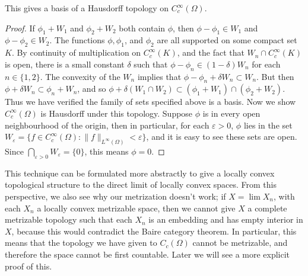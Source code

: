 \begin{theorem}
    This gives a basis of a Hausdorff topology on $C_c^\infty(\Omega)$.
\end{theorem}
\begin{proof}
    If $\phi_1 + W_1$ and $\phi_2 + W_2$ both contain $\phi$, then $\phi - \phi_1 \in W_1$ and $\phi - \phi_2 \in W_2$. The functions $\phi, \phi_1$, and $\phi_2$ are all supported on some compact set $K$. By continuity of multiplication on $C_c^\infty(K)$, and the fact that $W_n \cap C_c^\infty(K)$ is open, there is a small constant $\delta$ such that $\phi - \phi_n \in (1 - \delta) W_n$ for each $n \in \{ 1, 2 \}$. The convexity of the $W_n$ implies that $\phi - \phi_n + \delta W_n \subset W_n$. But then $\phi + \delta W_n \subset \phi_n + W_n$, and so $\phi + \delta (W_1 \cap W_2) \subset (\phi_1 + W_1) \cap (\phi_2 + W_2)$. Thus we have verified the family of sets specified above is a basis. Now we show $C_c^\infty(\Omega)$ is Hausdorff under this topology. Suppose $\phi$ is in every open neighbourhood of the origin, then in particular, for each $\varepsilon > 0$, $\phi$ lies in the set $W_\varepsilon = \{ f \in C_c^\infty(\Omega): \| f \|_{L^\infty(\Omega)} < \varepsilon \}$, and it is easy to see these sets are open. Since $\bigcap_{\varepsilon > 0} W_\varepsilon = \{ 0 \}$, this means $\phi = 0$.
\end{proof}

\begin{remark}
    This technique can be formulated more abstractly to give a locally convex topological structure to the direct limit of locally convex spaces. From this perspective, we also see why our metrization doesn't work; if $X = \lim X_n$, with each $X_n$ a locally convex metrizable space, then we cannot give $X$ a complete metrizable topology such that each $X_n$ is an embedding and has empty interior in $X$, because this would contradict the Baire category theorem. In particular, this means that the topology we have given to $C_c(\Omega)$ cannot be metrizable, and therefore the space cannot be first countable. Later we will see a more explicit proof of this.
\end{remark}


